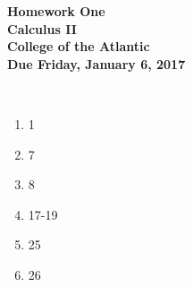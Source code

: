 \documentclass[12pt]{article}
\begin{document}
\pagestyle{empty}
 
\begin{center}
{\LARGE {\bf Homework One}}\\
\bigskip
{\Large {\bf Calculus II}}\\
\bigskip
{\Large {\bf College of the Atlantic}}\\
\bigskip
{ {\bf Due Friday, January 6, 2017}}\\ 
\end{center}

\hspace{2mm}\\


\begin{enumerate}
\setlength{\itemsep}{-1mm}
  \item 1
  \item 7
  \item 8
  \item 17-19
  \item 25
  \item 26 

\end{enumerate}


%
\end{document}
